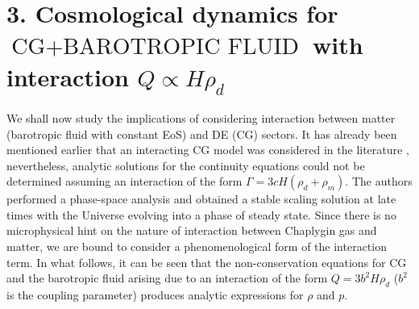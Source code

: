 \documentclass[two-column, nofootinbib]{revtex4-1}
\begin{document}
\section*{3. Cosmological dynamics for $\text{CG}+\text{BAROTROPIC FLUID}$ with interaction $Q \propto H\rho_d$} 

We shall now study the implications of considering interaction between matter (barotropic fluid with constant EoS) and DE (CG) sectors. It has already been mentioned earlier that an interacting CG model was considered in the literature \cite{Zhang1}, nevertheless, analytic solutions for the continuity equations could not be determined assuming an interaction of the form $\Gamma=3cH(\rho_d+\rho_m)$. The authors \cite{Zhang1} performed a phase-space analysis and obtained a stable scaling solution at late times with the Universe evolving into a phase of steady state. Since there is no microphysical hint on the nature of interaction between Chaplygin gas and matter, we are bound to consider a phenomenological form of the interaction term. In what follows, it can be seen that the non-conservation equations for CG and the barotropic fluid arising due to an interaction of the form $Q=3b^2H\rho_d$ ($b^2$ is the coupling parameter) produces analytic expressions for $\rho$ and $p$. 
\end{document}
